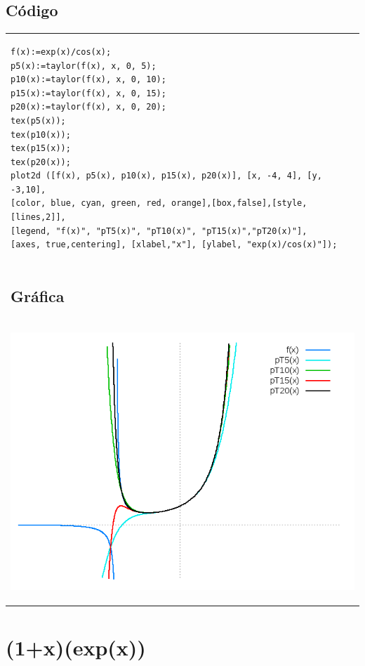 \documentclass[10pt]{article}
\begin{document}
\subsection{Código}
\begin{tabular}{l}
\begin{verbatim}  
f(x):=exp(x)/cos(x);
p5(x):=taylor(f(x), x, 0, 5);
p10(x):=taylor(f(x), x, 0, 10);
p15(x):=taylor(f(x), x, 0, 15);
p20(x):=taylor(f(x), x, 0, 20);
tex(p5(x));
tex(p10(x));
tex(p15(x));
tex(p20(x));
plot2d ([f(x), p5(x), p10(x), p15(x), p20(x)], [x, -4, 4], [y, -3,10],
[color, blue, cyan, green, red, orange],[box,false],[style,[lines,2]],
[legend, "f(x)", "pT5(x)", "pT10(x)", "pT15(x)","pT20(x)"],
[axes, true,centering], [xlabel,"x"], [ylabel, "exp(x)/cos(x)"]);

\end{verbatim} \\
\subsection{Gráfica}\\
\begin{center}
  
    \includegraphics[scale=0.4]{expcos}
\end{center}
\end{tabular}





\section{(1+x)(exp(x))}
\end{document}
